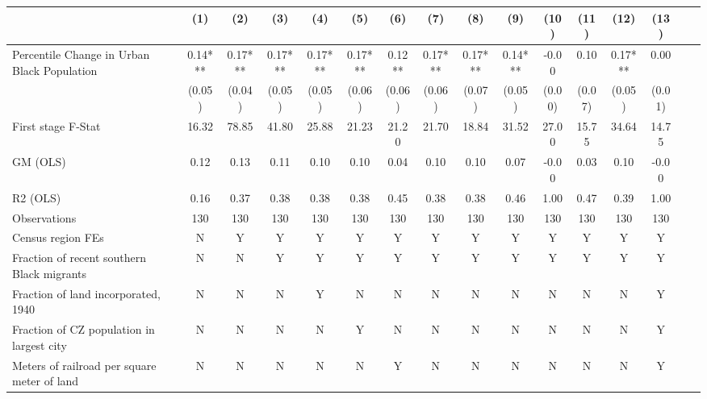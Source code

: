  \begin{tabular}{l*{15}{c}} \toprule
                    &\multicolumn{1}{c}{(1)}   &\multicolumn{1}{c}{(2)}   &\multicolumn{1}{c}{(3)}   &\multicolumn{1}{c}{(4)}   &\multicolumn{1}{c}{(5)}   &\multicolumn{1}{c}{(6)}   &\multicolumn{1}{c}{(7)}   &\multicolumn{1}{c}{(8)}   &\multicolumn{1}{c}{(9)}   &\multicolumn{1}{c}{(10)}   &\multicolumn{1}{c}{(11)}   &\multicolumn{1}{c}{(12)}   &\multicolumn{1}{c}{(13)}   \\
\midrule
Percentile Change in Urban Black Population&  0.14***&  0.17***&  0.17***&  0.17***&  0.17***&  0.12** &  0.17***&  0.17***&  0.14***& -0.00   &  0.10   &  0.17***&  0.00   \\
                    &(0.05)   &(0.04)   &(0.05)   &(0.05)   &(0.06)   &(0.06)   &(0.06)   &(0.07)   &(0.05)   &(0.00)   &(0.07)   &(0.05)   &(0.01)   \\
\midrule
First stage F-Stat  & 16.32   & 78.85   & 41.80   & 25.88   & 21.23   & 21.20   & 21.70   & 18.84   & 31.52   & 27.00   & 15.75   & 34.64   & 14.75   \\
GM (OLS)            &  0.12   &  0.13   &  0.11   &  0.10   &  0.10   &  0.04   &  0.10   &  0.10   &  0.07   & -0.00   &  0.03   &  0.10   & -0.00   \\
R2 (OLS)            &  0.16   &  0.37   &  0.38   &  0.38   &  0.38   &  0.45   &  0.38   &  0.38   &  0.46   &  1.00   &  0.47   &  0.39   &  1.00   \\
Observations        &   130   &   130   &   130   &   130   &   130   &   130   &   130   &   130   &   130   &   130   &   130   &   130   &   130   \\
Census region FEs   &     N   &     Y   &     Y   &     Y   &     Y   &     Y   &     Y   &     Y   &     Y   &     Y   &     Y   &     Y   &     Y   \\
Fraction of recent southern Black migrants&     N   &     N   &     Y   &     Y   &     Y   &     Y   &     Y   &     Y   &     Y   &     Y   &     Y   &     Y   &     Y   \\
Fraction of land incorporated, 1940&     N   &     N   &     N   &     Y   &     N   &     N   &     N   &     N   &     N   &     N   &     N   &     N   &     Y   \\
Fraction of CZ population in largest city&     N   &     N   &     N   &     N   &     Y   &     N   &     N   &     N   &     N   &     N   &     N   &     N   &     Y   \\
Meters of railroad per square meter of land&     N   &     N   &     N   &     N   &     N   &     Y   &     N   &     N   &     N   &     N   &     N   &     N   &     Y   \\

\end{tabular}

